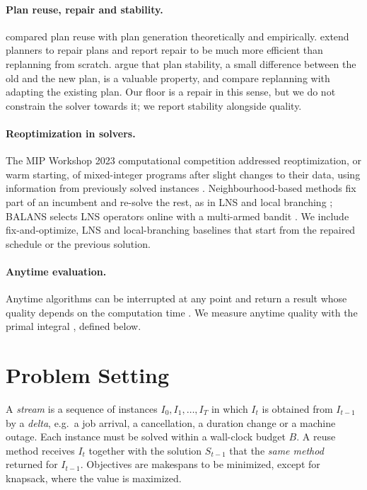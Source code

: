\documentclass[letterpaper]{article} %
\begin{document}
\paragraph{Plan reuse, repair and stability.} \citet{nebel1995} compared plan reuse with plan generation theoretically and empirically. \citet{vanderkrogt2005} extend planners to repair plans and report repair to be much more efficient than replanning from scratch. \citet{fox2006} argue that plan stability, a small difference between the old and the new plan, is a valuable property, and compare replanning with adapting the existing plan. Our floor is a repair in this sense, but we do not constrain the solver towards it; we report stability alongside quality.

\paragraph{Reoptimization in solvers.} The MIP Workshop 2023 computational competition addressed reoptimization, or warm starting, of mixed-integer programs after slight changes to their data, using information from previously solved instances \citep{bolusani2024}. Neighbourhood-based methods fix part of an incumbent and re-solve the rest, as in LNS \citep{shaw1998} and local branching \citep{fischetti2003}; BALANS selects LNS operators online with a multi-armed bandit \citep{cai2025}. We include fix-and-optimize, LNS and local-branching baselines that start from the repaired schedule or the previous solution.

\paragraph{Anytime evaluation.} Anytime algorithms can be interrupted at any point and return a result whose quality depends on the computation time \citep{dean1988,zilberstein1996}. We measure anytime quality with the primal integral \citep{berthold2013}, defined below.

\section{Problem Setting}

A \emph{stream} is a sequence of instances $I_0, I_1, \dots, I_T$ in which $I_t$ is obtained from $I_{t-1}$ by a \emph{delta}, e.g.\ a job arrival, a cancellation, a duration change or a machine outage. Each instance must be solved within a wall-clock budget $B$. A reuse method receives $I_t$ together with the solution $S_{t-1}$ that the \emph{same method} returned for $I_{t-1}$. Objectives are makespans to be minimized, except for knapsack, where the value is maximized.
\end{document}
